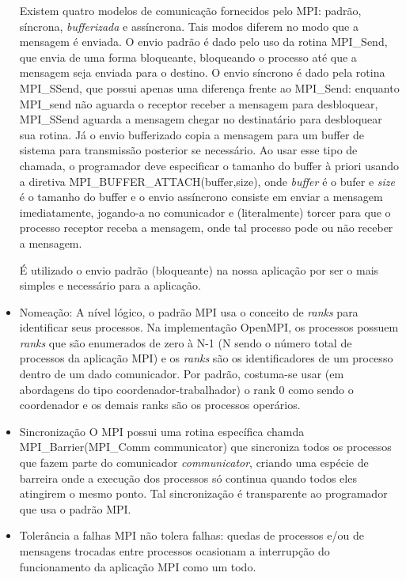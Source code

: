 \documentclass[a4paper,10pt]{article}
\begin{document}
\begin{itemize}
Existem quatro modelos de comunicação fornecidos pelo MPI: padrão, síncrona, \emph{bufferizada} e assíncrona. Tais modos diferem no modo que a mensagem é enviada. O envio padrão é dado pelo uso da rotina MPI\_Send, que envia de uma forma bloqueante, bloqueando o processo até que a mensagem seja enviada para o destino. O envio síncrono é dado pela rotina MPI\_SSend, que possui apenas uma diferença frente ao MPI\_Send: enquanto MPI\_send não aguarda o receptor receber a mensagem para desbloquear, MPI\_SSend aguarda a mensagem chegar no destinatário para desbloquear sua rotina. Já o envio bufferizado copia a mensagem para um buffer de sistema para transmissão posterior se necessário. Ao usar esse tipo de chamada, o programador deve especificar o tamanho do buffer à priori usando a diretiva MPI\_BUFFER\_ATTACH(buffer,size), onde \emph{buffer} é o bufer e \emph{size} é o tamanho do buffer e o envio assíncrono consiste em enviar a mensagem imediatamente, jogando-a no comunicador e (literalmente) torcer para que o processo receptor receba a mensagem, onde tal processo pode ou não receber a mensagem.

É utilizado o envio padrão (bloqueante) na nossa aplicação por ser o mais simples e necessário para a aplicação.\\


\item{Nomeação}: A nível lógico, o padrão MPI usa o conceito de \emph{ranks} para identificar seus processos. Na implementação OpenMPI, os processos possuem \emph{ranks} que são enumerados de zero à N-1 (N sendo o número total de processos da aplicação MPI)  e os \emph{ranks} são os identificadores de um processo dentro de um dado comunicador. Por padrão, costuma-se usar (em abordagens do tipo coordenador-trabalhador) o rank 0 como sendo o coordenador e os demais ranks são os processos operários.\\

\item{Sincronização} O MPI possui uma rotina específica chamda MPI\_Barrier(MPI\_Comm communicator) que sincroniza todos os processos que fazem parte do comunicador \emph{communicator}, criando uma espécie de barreira onde a execução dos processos só continua quando todos eles atingirem o mesmo ponto. Tal sincronização é transparente ao programador que usa o padrão MPI.

\item{Tolerância a falhas} MPI não tolera falhas: quedas de processos e/ou de mensagens trocadas entre processos ocasionam a interrupção do funcionamento da aplicação MPI como um todo.


\end{itemize}
\end{document}
